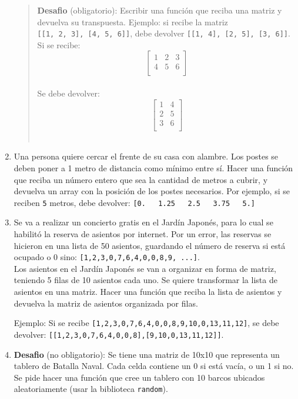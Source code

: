 \documentclass[
  letterpaper,
  DIV=11,
  numbers=noendperiod]{scrreprt}
\begin{document}
\begin{enumerate}
  \begin{quote}
  \textbf{Desafio} (obligatorio): Escribir una función que reciba una
  matriz y devuelva su transpuesta. Ejemplo: si recibe la matriz
  \texttt{{[}{[}1,\ 2,\ 3{]},\ {[}4,\ 5,\ 6{]}{]}}, debe devolver
  \texttt{{[}{[}1,\ 4{]},\ {[}2,\ 5{]},\ {[}3,\ 6{]}{]}}. Si se
  recibe:\\
  \[
  \begin{bmatrix}
  1 & 2 & 3  \\
  4 & 5 & 6  \\
  \end{bmatrix}
  \]\\
  Se debe devolver:\\
  \[
  \begin{bmatrix}
  1 & 4 \\
  2 & 5 \\
  3 & 6 \\
  \end{bmatrix}
  \]\\
  \end{quote}
\item
  Una persona quiere cercar el frente de su casa con alambre. Los postes
  se deben poner a 1 metro de distancia como mínimo entre sí. Hacer una
  función que reciba un número entero que sea la cantidad de metros a
  cubrir, y devuelva un array con la posición de los postes necesarios.
  Por ejemplo, si se reciben \texttt{5} metros, debe devolver:
  \texttt{{[}0.\ \ \ 1.25\ \ \ 2.5\ \ \ 3.75\ \ \ 5.{]}}
\item
  Se va a realizar un concierto gratis en el Jardín Japonés, para lo
  cual se habilitó la reserva de asientos por internet. Por un error,
  las reservas se hicieron en una lista de 50 asientos, guardando el
  número de reserva si está ocupado o 0 sino:
  \texttt{{[}1,2,3,0,7,6,4,0,0,8,9,\ ...{]}}.\\
  Los asientos en el Jardín Japonés se van a organizar en forma de
  matriz, teniendo 5 filas de 10 asientos cada uno. Se quiere
  transformar la lista de asientos en una matriz. Hacer una función que
  reciba la lista de asientos y devuelva la matriz de asientos
  organizada por filas.

  Ejemplo: Si se recibe
  \texttt{{[}1,2,3,0,7,6,4,0,0,8,9,10,0,13,11,12{]}}, se debe devolver:
  \texttt{{[}{[}1,2,3,0,7,6,4,0,0,8{]},{[}9,10,0,13,11,12{]}{]}}.
\item
  \textbf{Desafio} (no obligatorio): Se tiene una matriz de 10x10 que
  representa un tablero de Batalla Naval. Cada celda contiene un 0 si
  está vacía, o un 1 si no. Se pide hacer una función que cree un
  tablero con 10 barcos ubicados aleatoriamente (usar la biblioteca
  \texttt{random}).


\end{enumerate}
\end{document}
